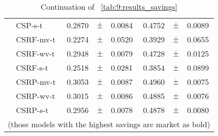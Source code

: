 \begin{table}[!t]
\begin{tabular}{l l r@{\hskip 0in}c@{\hskip 0in}l r@{\hskip 0in}c@{\hskip 0in}l  }
&CSP-s-t &  0.2870 &$\pm$& 0.0084 & 0.4752 &$\pm$& 0.0089\\ 
&CSRF-mv-t &  0.2274 &$\pm$& 0.0520 & 0.3929 &$\pm$& 0.0655\\ 
&CSRF-wv-t &  0.2948 &$\pm$& 0.0079 & 0.4728 &$\pm$& 0.0125\\ 
&CSRF-s-t &  0.2518 &$\pm$& 0.0281 & 0.3854 &$\pm$& 0.0899\\ 
&CSRP-mv-t & 0.3053 &$\pm$& 0.0087 & 0.4960 &$\pm$& 0.0075\\ 
&CSRP-wv-t & 0.3015 &$\pm$& 0.0086 & 0.4885 &$\pm$& 0.0076\\ 
&CSRP-s-t & 0.2956 &$\pm$& 0.0078 & 0.4878 &$\pm$& 0.0080\\ 
  \hline
  \multicolumn{8}{c}{(those models with the highest savings are market as bold)}
  \end{tabular}
    \caption{Continuation of \tablename{~\ref{tab:9:results_savings}}}
    \label{tab:9:results_savings2}
  \end{table}
  










